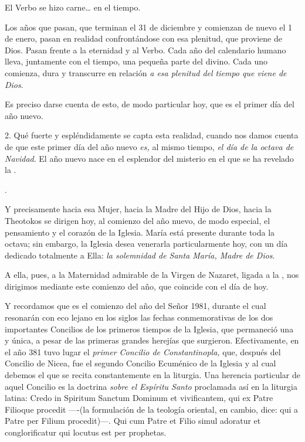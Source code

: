\begin{body}
\begin{body}
El Verbo se hizo carne\ldots{} en el tiempo.

Los años que pasan, que terminan el 31 de diciembre y comienzan de nuevo el 1 de enero, pasan en realidad confrontándose con esa plenitud, que proviene de Dios. Pasan frente a la eternidad y al Verbo. Cada año del calendario humano lleva, juntamente con el tiempo, una pequeña parte del  divino. Cada uno comienza, dura y transcurre en relación \emph{a esa plenitud del tiempo que viene de Dios}.

Es preciso darse cuenta de esto, de modo particular hoy, que es el primer día del año nuevo.

2. Qué fuerte y espléndidamente se capta esta realidad, cuando nos damos cuenta de que este primer día del año nuevo \emph{es,} al mismo tiempo, \emph{el día de la octava de Navidad}. El año nuevo nace en el esplendor del misterio en el que se ha revelado la .

.

Y precisamente hacia esa Mujer, hacia la Madre del Hijo de Dios, hacia la Theotokos se dirigen hoy, al comienzo del año nuevo, de modo especial, el pensamiento y el corazón de la Iglesia. María está presente durante toda la octava; sin embargo, la Iglesia desea venerarla particularmente hoy, con un día dedicado totalmente a Ella: \emph{la solemnidad de Santa María, Madre de Dios}.

A ella, pues, a la Maternidad admirable de la Virgen de Nazaret, ligada a la , nos dirigimos mediante este comienzo del año, que coincide con el día de hoy.

Y recordamos que es el comienzo del año del Señor 1981, durante el cual resonarán con eco lejano en los siglos las fechas conmemorativas de los dos importantes Concilios de los primeros tiempos de la Iglesia, que permaneció una y única, a pesar de las primeras grandes herejías que surgieron. Efectivamente, en el año 381 tuvo lugar el \emph{primer Concilio de Constantinopla,} que, después del Concilio de Nicea, fue el segundo Concilio Ecuménico de la Iglesia y al cual debemos el  que se recita constantemente en la liturgia. Una herencia particular de aquel Concilio es la doctrina \emph{sobre el Espíritu Santo} proclamada así en la liturgia latina: Credo in Spiritum Sanctum Dominum et vivificantem, qui ex Patre Filioque procedit ----(la formulación de la teología oriental, en cambio, dice: qui a Patre per Filium procedit)---. Qui cum Patre et Filio simul adoratur et conglorificatur qui locutus est per prophetas.


\end{body}
\end{body}

